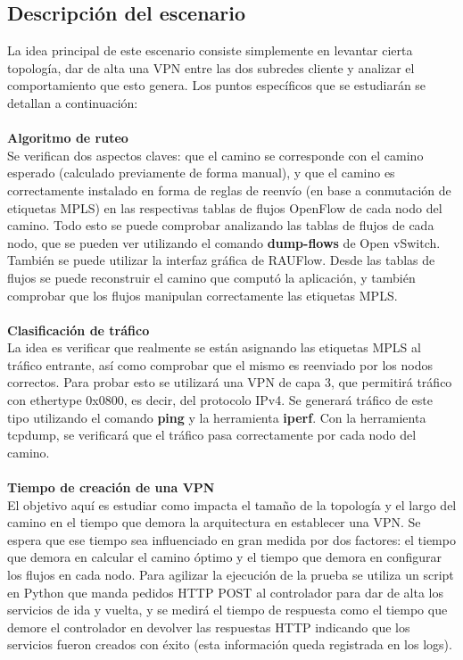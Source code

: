 \subsection{Descripción del escenario}
La idea principal de este escenario consiste simplemente en levantar cierta topología, dar de alta una VPN entre las dos subredes cliente y analizar el comportamiento que esto genera. Los puntos específicos que se estudiarán se detallan a continuación: \\ \\
\textbf{Algoritmo de ruteo} \\
 Se verifican dos aspectos claves: que el camino se corresponde con el camino esperado (calculado previamente de forma manual), y que el camino es correctamente instalado en forma de reglas de reenvío (en base a conmutación de etiquetas MPLS) en las respectivas tablas de flujos OpenFlow de cada nodo del camino. Todo esto se puede comprobar analizando las tablas de flujos de cada nodo, que se pueden ver utilizando el comando \textbf{dump-flows} de Open vSwitch. También se puede utilizar la interfaz gráfica de RAUFlow. Desde las tablas de flujos se puede reconstruir el camino que computó la aplicación, y también comprobar que los flujos manipulan correctamente las etiquetas MPLS. \\ \\
\textbf{Clasificación de tráfico} \\
La idea es verificar que realmente se están asignando las etiquetas MPLS al tráfico entrante, así como comprobar que el mismo es reenviado por los nodos correctos. Para probar esto se utilizará una VPN de capa 3, que permitirá tráfico con ethertype 0x0800, es decir, del protocolo IPv4. Se generará tráfico de este tipo utilizando el comando \textbf{ping} y la herramienta \textbf{iperf}. Con la herramienta tcpdump, se verificará que el tráfico pasa correctamente por cada nodo del camino. \\ \\
\textbf{Tiempo de creación de una VPN} \\
El objetivo aquí es estudiar como impacta el tamaño de la topología y el largo del camino en el tiempo que demora la arquitectura en establecer una VPN. Se espera que ese tiempo sea influenciado en gran medida por dos factores: el tiempo que demora en calcular el camino óptimo y el tiempo que demora en configurar los flujos en cada nodo. Para agilizar la ejecución de la prueba se utiliza un script en Python que manda pedidos HTTP POST al controlador para dar de alta los servicios de ida y vuelta, y se medirá el tiempo de respuesta como el tiempo que demore el controlador en devolver las respuestas HTTP indicando que los servicios fueron creados con éxito (esta información queda registrada en los logs). \\ \\
